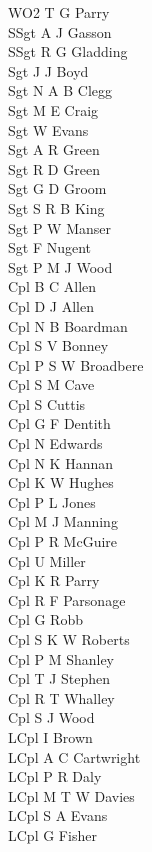 \begin{multicols}{2}
  \noindent
  WO2 T G Parry \\
  SSgt A J Gasson \\
  SSgt R G Gladding \\
  Sgt J J Boyd \\
  Sgt N A B Clegg \\
  Sgt M E Craig \\
  Sgt W Evans \\
  Sgt A R Green \\
  Sgt R D Green \\
  Sgt G D Groom \\
  Sgt S R B King \\
  Sgt P W Manser \\
  Sgt F Nugent \\
  Sgt P M J Wood \\
  Cpl B C Allen \\
  Cpl D J Allen \\
  Cpl N B Boardman \\
  Cpl S V Bonney \\
  Cpl P S W Broadbere \\
  Cpl S M Cave \\
  Cpl S Cuttis \\
  Cpl G F Dentith \\
  Cpl N Edwards \\
  Cpl N K Hannan \\
  Cpl K W Hughes \\
  Cpl P L Jones \\
  Cpl M J Manning \\
  Cpl P R McGuire \\
  Cpl U Miller \\
  Cpl K R Parry \\
  Cpl R F Parsonage \\
  Cpl G Robb \\
  Cpl S K W Roberts \\
  Cpl P M Shanley \\
  Cpl T J Stephen \\
  Cpl R T Whalley \\
  Cpl S J Wood \\
  LCpl I Brown \\
  LCpl A C Cartwright \\
  LCpl P R Daly \\
  LCpl M T W Davies \\
  LCpl S A Evans \\
  LCpl G Fisher \\

\end{multicols}
